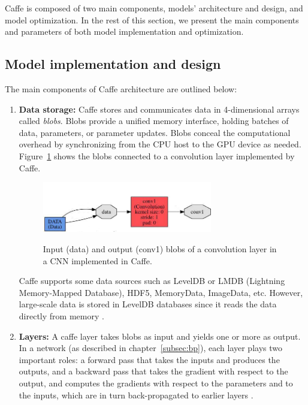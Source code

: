 Caffe is composed of two main components, models' architecture and design, and model optimization. In the rest of this section, we present the main components and parameters of both model implementation and optimization.
\subsection{Model implementation and design}
The main components of Caffe architecture are outlined below:
\begin{enumerate}

\item \textbf{Data storage:} Caffe stores and communicates data in 4-dimensional arrays called \textit{blobs}. Blobs provide a unified memory interface, holding batches of data, parameters, or parameter updates. Blobs conceal the computational overhead by synchronizing from the CPU host to the GPU device as needed. Figure~\ref{fig:blob} shows the blobs connected to a convolution layer implemented by Caffe.


\begin{figure}[H]
	\centering
	{\includegraphics[width=0.7\textwidth]{images/caffeconvlayer}}
	\caption{Input (data) and output (conv1) blobs of a convolution layer in a CNN implemented in Caffe.}
	\label{fig:blob}
\end{figure}


Caffe supports some data sources such as LevelDB or LMDB (Lightning Memory-Mapped Database), HDF5, MemoryData, ImageData, etc. However, large-scale data is stored in LevelDB databases since it reads the data directly from memory \cite{caffe}. 
\item \textbf{Layers:} A caffe layer takes blobs as input and yields one or more as output. In a network (as described in chapter~\ref{subsec:bp}), each layer plays two important roles: a forward pass that takes the inputs and produces the outputs, and a backward pass that takes the gradient with respect to the output, and computes the gradients with respect to the parameters and to the inputs, which are in turn back-propagated to earlier layers \cite{jia2014caffe}.


\end{enumerate}
